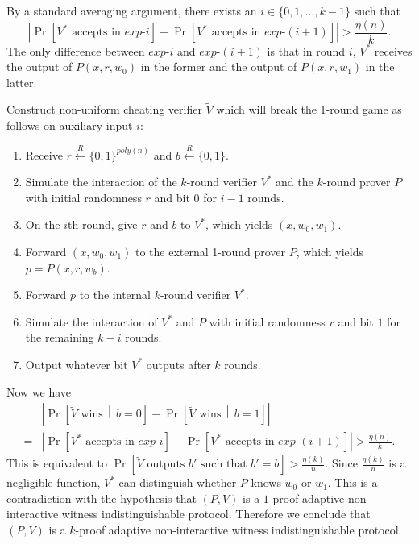 \documentclass[draft]{article}
\newcommand{\getr}{\overset{R}{\gets}}
\begin{document}
\begin{enumerate}
  By a standard averaging argument, there exists an $i\in\{0,1,\ldots, k-1\}$ such that
  \begin{displaymath}
    \left|\Pr\left[V^*\text{ accepts in } exp\mbox{-}i\right] - \Pr\left[V^*\text{ accepts in } exp\mbox{-}(i+1)\right]\right| > \frac{\eta(n)}{k}.
  \end{displaymath}
  The only difference between $exp\mbox{-}i$ and $exp\mbox{-}(i+1)$ is that in round $i$, $V^*$ receives the output of $P(x, r, w_0)$ in the former and the output of $P(x, r, w_1)$ in the latter.

  Construct non-uniform cheating verifier $\tilde{V}$ which will break the 1-round game as follows on auxiliary input $i$:
  \begin{enumerate}
  \item Receive $r\getr\{0,1\}^{poly(n)}$ and $b\getr\{0, 1\}$.
  \item Simulate the interaction of the $k$-round verifier $V^*$ and the $k$-round prover $P$ with initial randomness $r$ and bit $0$ for $i - 1$ rounds.
  \item On the $i$th round, give $r$ and $b$ to $V^*$, which yields $(x, w_0, w_1)$.
  \item Forward $(x, w_0, w_1)$ to the external 1-round prover $P$, which yields $p=P(x, r, w_b)$.
  \item Forward $p$ to the internal $k$-round verifier $V^*$.
  \item Simulate the interaction of $V^*$ and $P$ with initial randomness $r$ and bit $1$ for the remaining $k - i$ rounds.
  \item Output whatever bit $V^*$ outputs after $k$ rounds.
  \end{enumerate}

  Now we have
  \begin{align*}
    & \left|\Pr\left[\tilde{V} \text{ wins} \,\middle|\, b=0\right] - \Pr\left[\tilde{V} \text{ wins} \,\middle|\, b=1\right]\right| \\
    = & \left|\Pr\left[V^*\text{ accepts in } exp\mbox{-}i\right] - \Pr\left[V^*\text{ accepts in } exp\mbox{-}(i+1)\right]\right| > \frac{\eta(n)}{k}.
  \end{align*}
  This is equivalent to $\Pr[\tilde{V}\text{ outputs } b' \text{ such that } b'=b] > \frac{\eta(k)}{n}$.
  Since $\frac{\eta(k)}{n}$ is a negligible function, $V^*$ can distinguish whether $P$ knows $w_0$ or $w_1$.
  This is a contradiction with the hypothesis that $(P, V)$ is a $1$-proof adaptive non-interactive witness indistinguishable protocol.
  Therefore we conclude that $(P, V)$ is a $k$-proof adaptive non-interactive witness indistinguishable protocol.
\end{enumerate}
\end{document}

